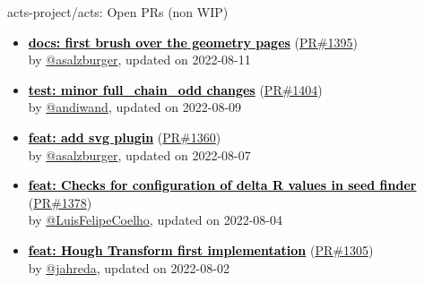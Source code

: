 \begin{frame}[allowframebreaks]{ acts-project/acts: Open PRs (non WIP)}

  \begin{itemize}
    
    \item
    \textbf{\href{https://github.com/acts-project/acts/pull/1395}{\textcolor{black}{docs: first brush over the geometry pages}}}
    (\href{https://github.com/acts-project/acts/pull/1395}{PR\#1395}) \\
    by \href{https://github.com/asalzburger}{ @asalzburger}, updated on 2022-08-11

    \item
    \textbf{\href{https://github.com/acts-project/acts/pull/1404}{\textcolor{black}{test: minor full\_chain\_odd changes}}}
    (\href{https://github.com/acts-project/acts/pull/1404}{PR\#1404}) \\
    by \href{https://github.com/andiwand}{ @andiwand}, updated on 2022-08-09

    \item
    \textbf{\href{https://github.com/acts-project/acts/pull/1360}{\textcolor{black}{feat: add svg plugin}}}
    (\href{https://github.com/acts-project/acts/pull/1360}{PR\#1360}) \\
    by \href{https://github.com/asalzburger}{ @asalzburger}, updated on 2022-08-07

    \item
    \textbf{\href{https://github.com/acts-project/acts/pull/1378}{\textcolor{black}{feat: Checks for configuration of delta R values in seed finder}}}
    (\href{https://github.com/acts-project/acts/pull/1378}{PR\#1378}) \\
    by \href{https://github.com/LuisFelipeCoelho}{ @LuisFelipeCoelho}, updated on 2022-08-04

    \item
    \textbf{\href{https://github.com/acts-project/acts/pull/1305}{\textcolor{black}{feat: Hough Transform first implementation}}}
    (\href{https://github.com/acts-project/acts/pull/1305}{PR\#1305}) \\
    by \href{https://github.com/jahreda}{ @jahreda}, updated on 2022-08-02

  \end{itemize}

\end{frame}






